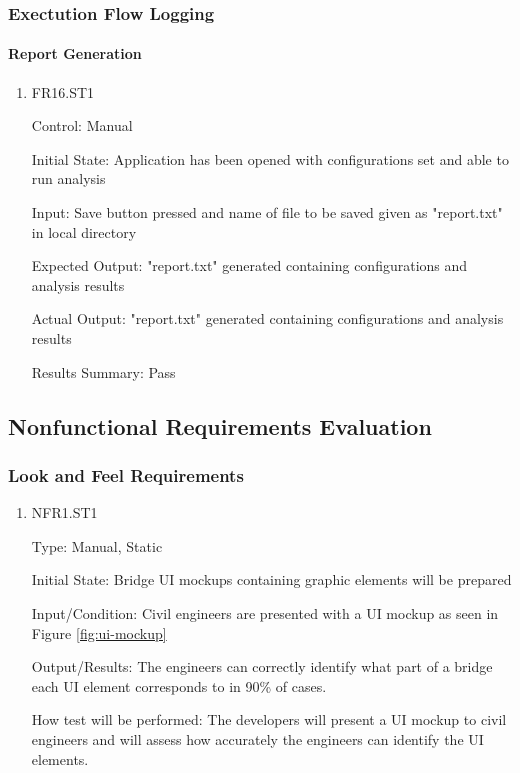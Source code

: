 \documentclass[12pt, titlepage]{article}
\begin{document}
\subsubsection{Exectution Flow Logging}

\paragraph{Report Generation}

\begin{enumerate}

\item{FR16.ST1\\}

Control: Manual
					
Initial State: Application has been opened with configurations set and able to run analysis
					
Input: Save button pressed and name of file to be saved given as "report.txt" in local directory
					
Expected Output: "report.txt" generated containing configurations and analysis results

Actual Output: "report.txt" generated containing configurations and analysis results

Results Summary: Pass
					
\end{enumerate}

\subsection{Nonfunctional Requirements Evaluation}

\subsubsection{Look and Feel Requirements}

\begin{enumerate}

\item{NFR1.ST1\\}

Type: Manual, Static

Initial State: Bridge UI mockups containing graphic elements will be prepared

Input/Condition: Civil engineers are presented with a UI mockup as seen in Figure \ref{fig:ui-mockup} 

Output/Results: The engineers can correctly identify what part of a bridge each UI element corresponds to in 90\% of cases.

How test will be performed: The developers will present a UI mockup to civil engineers and will assess how accurately the engineers can identify the UI elements.

\end{enumerate}
\end{document}
